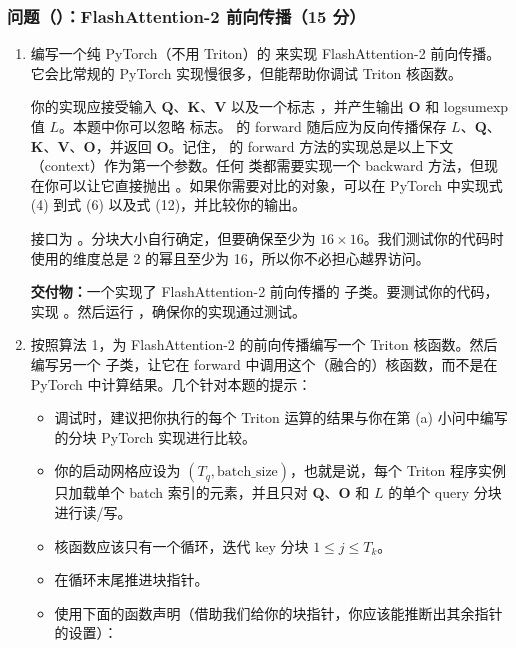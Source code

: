 \subsubsection*{问题（）：FlashAttention-2 前向传播（15 分）}

\begin{enumerate}[label=(\alph*)]
  \item 编写一个纯 PyTorch（不用 Triton）的  来实现 FlashAttention-2 前向传播。它会比常规的 PyTorch 实现慢很多，但能帮助你调试 Triton 核函数。

  你的实现应接受输入 $\boldsymbol{Q}$、$\boldsymbol{K}$、$\boldsymbol{V}$ 以及一个标志 ，并产生输出 $\boldsymbol{O}$ 和 logsumexp 值 $L$。本题中你可以忽略  标志。 的 forward 随后应为反向传播保存 $L$、$\boldsymbol{Q}$、$\boldsymbol{K}$、$\boldsymbol{V}$、$\boldsymbol{O}$，并返回 $\boldsymbol{O}$。记住， 的 forward 方法的实现总是以上下文（context）作为第一个参数。任何  类都需要实现一个 backward 方法，但现在你可以让它直接抛出 。如果你需要对比的对象，可以在 PyTorch 中实现式 (4) 到式 (6) 以及式 (12)，并比较你的输出。

  接口为 。分块大小自行确定，但要确保至少为 $16 \times 16$。我们测试你的代码时使用的维度总是 2 的幂且至少为 16，所以你不必担心越界访问。

  \textbf{交付物：}一个实现了 FlashAttention-2 前向传播的  子类。要测试你的代码，实现 。然后运行 ，确保你的实现通过测试。

  \item 按照算法 1，为 FlashAttention-2 的前向传播编写一个 Triton 核函数。然后编写另一个  子类，让它在 forward 中调用这个（融合的）核函数，而不是在 PyTorch 中计算结果。几个针对本题的提示：
  \begin{itemize}
    \item 调试时，建议把你执行的每个 Triton 运算的结果与你在第 (a) 小问中编写的分块 PyTorch 实现进行比较。
    \item 你的启动网格应设为 $(T_q, \text{batch\_size})$，也就是说，每个 Triton 程序实例只加载单个 batch 索引的元素，并且只对 $\boldsymbol{Q}$、$\boldsymbol{O}$ 和 $L$ 的单个 query 分块进行读/写。
    \item 核函数应该只有一个循环，迭代 key 分块 $1 \le j \le T_k$。
    \item 在循环末尾推进块指针。
    \item 使用下面的函数声明（借助我们给你的块指针，你应该能推断出其余指针的设置）：
  \end{itemize}


\end{enumerate}
